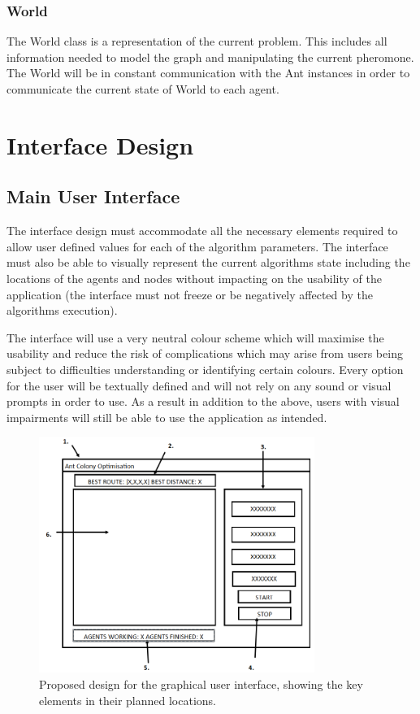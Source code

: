 \subsubsection{World}
The World class is a representation of the current problem. This includes all information needed to model the graph and manipulating the current pheromone. The World will be in constant communication with the Ant instances in order to communicate the current state of World to each agent.

\section{Interface Design}
\subsection{Main User Interface}
\label{ssec:mainUI}
The interface design must accommodate all the necessary elements required to allow user defined values for each of the algorithm parameters. The interface must also be able to visually represent the current algorithms state including the locations of the agents and nodes without impacting on the usability of the application (the interface must not freeze or be negatively affected by the algorithms execution).

The interface will use a very neutral colour scheme which will maximise the usability and reduce the risk of complications which may arise from users being subject to difficulties understanding or identifying certain colours. Every option for the user will be textually defined and will not rely on any sound or visual prompts in order to use. As a result in addition to the above, users with visual impairments will still be able to use the application as intended.

\begin{figure}[H]
\centering
\includegraphics[width=0.8\textwidth]{Images/design/screen}
\caption[User Interface Design]{Proposed design for the graphical user interface, showing the key elements in their planned locations.}
\label{fig:interface}
\end{figure}

